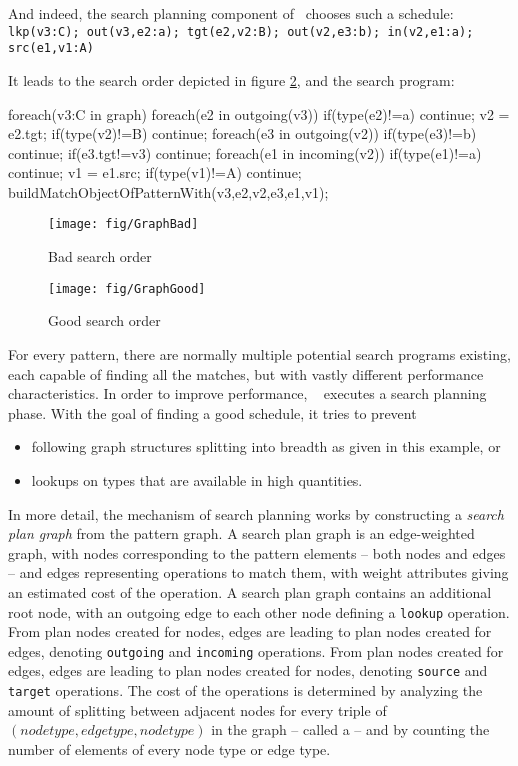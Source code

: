 And indeed, the search planning component of \GrG~chooses such a schedule:\\
\texttt{lkp(v3:C); out(v3,e2:a); tgt(e2,v2:B); out(v2,e3:b); in(v2,e1:a); src(e1,v1:A)}

It leads to the search order depicted in figure \ref{figgoodsearch}, and the search program:

\begin{csharp}
foreach(v3:C in graph) {
	foreach(e2 in outgoing(v3)) {
		if(type(e2)!=a) continue;
		v2 = e2.tgt;
		if(type(v2)!=B) continue;
		foreach(e3 in outgoing(v2)) {
			if(type(e3)!=b) continue;
			if(e3.tgt!=v3) continue;
				foreach(e1 in incoming(v2)) {
				if(type(e1)!=a) continue;
				v1 = e1.src;
				if(type(v1)!=A) continue;
				buildMatchObjectOfPatternWith(v3,e2,v2,e3,e1,v1);
			} 
		}
	}
}
\end{csharp}

\vspace{15cm}

\begin{figure}[hptb]
  \centering
  \texttt{[image: fig/GraphBad]}
  \caption{Bad search order}
  \label{figbadsearch}
\end{figure}

\begin{figure}[hpbt]
  \centering
  \texttt{[image: fig/GraphGood]}
  \caption{Good search order}
  \label{figgoodsearch}
\end{figure}

For every pattern, there are normally multiple potential search programs existing,
each capable of finding all the matches, but with vastly different performance characteristics.
In order to improve performance, \GrG~ executes a search planning phase.
With the goal of finding a good schedule, it tries to prevent
\begin{itemize}
	\item following graph structures splitting into breadth as given in this example, or
	\item lookups on types that are available in high quantities.
\end{itemize}

In more detail, the mechanism of search planning works by constructing a \emph{search plan graph} from the pattern graph.
A search plan graph is an edge-weighted graph, with nodes corresponding to the pattern elements -- both nodes and edges -- and edges representing operations to match them, with weight attributes giving an estimated cost of the operation. 
A search plan graph contains an additional root node, with an outgoing edge to each other node defining a \texttt{lookup} operation. 
From plan nodes created for nodes, edges are leading to plan nodes created for edges, denoting \texttt{outgoing} and \texttt{incoming} operations.
From plan nodes created for edges, edges are leading to plan nodes created for nodes, denoting \texttt{source} and \texttt{target} operations.
The cost of the operations is determined by analyzing the amount of splitting between adjacent nodes for every triple of $(node type, edge type, node type)$ in the graph -- called a  -- and by counting the number of elements of every node type or edge type.

